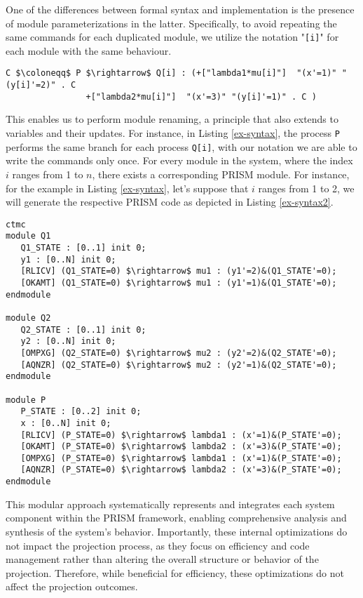 One of the differences between formal syntax and implementation is the presence of module parameterizations in the latter. Specifically, to avoid repeating the same commands for each duplicated module, we utilize the notation "\texttt{[i]}" for each module with the same behaviour.   
\begin{lstlisting}[style=chor-color,breaklines=true, postbreak=\mbox{\textcolor{red}{$\hookrightarrow$}\space},caption={Example of an use of parameterization in the choreographic language},captionpos=b,label={ex-syntax}]
	C $\coloneqq$ P $\rightarrow$ Q[i] : (+["lambda1*mu[i]"]  "(x'=1)" "(y[i]'=2)" . C
			    +["lambda2*mu[i]"]  "(x'=3)" "(y[i]'=1)" . C )
\end{lstlisting}
This enables us to perform module renaming, a principle that also extends to variables and their updates. For instance, in Listing \ref{ex-syntax}, the process \texttt{P} performs the same branch for each process \texttt{Q[i]}, with our notation we are able to write the commands only once. 
For every module in the system, where the index 
$i$ ranges from 1 to $n$, there exists a corresponding PRISM module. For instance, for the example in Listing \ref{ex-syntax}, let's suppose that $i$ ranges  from 1 to 2, we will generate the respective PRISM code as depicted in Listing \ref{ex-syntax2}. 
\begin{lstlisting}[style=prism-color,caption={PRISM code generated for the choreography in Listing \ref{ex-syntax}},captionpos=b,label={ex-syntax2}]
ctmc
module Q1
   Q1_STATE : [0..1] init 0;
   y1 : [0..N] init 0;
   [RLICV] (Q1_STATE=0) $\rightarrow$ mu1 : (y1'=2)&(Q1_STATE'=0);
   [OKAMT] (Q1_STATE=0) $\rightarrow$ mu1 : (y1'=1)&(Q1_STATE'=0);
endmodule

module Q2
   Q2_STATE : [0..1] init 0;
   y2 : [0..N] init 0;
   [OMPXG] (Q2_STATE=0) $\rightarrow$ mu2 : (y2'=2)&(Q2_STATE'=0);
   [AQNZR] (Q2_STATE=0) $\rightarrow$ mu2 : (y2'=1)&(Q2_STATE'=0);
endmodule

module P
   P_STATE : [0..2] init 0;
   x : [0..N] init 0;
   [RLICV] (P_STATE=0) $\rightarrow$ lambda1 : (x'=1)&(P_STATE'=0);
   [OKAMT] (P_STATE=0) $\rightarrow$ lambda2 : (x'=3)&(P_STATE'=0);
   [OMPXG] (P_STATE=0) $\rightarrow$ lambda1 : (x'=1)&(P_STATE'=0);
   [AQNZR] (P_STATE=0) $\rightarrow$ lambda2 : (x'=3)&(P_STATE'=0);
endmodule
\end{lstlisting}
This modular approach systematically represents and integrates each system component within the PRISM framework, enabling comprehensive analysis and synthesis of the system's behavior. Importantly, these internal optimizations do not impact the projection process, as they focus on efficiency and code management rather than altering the overall structure or behavior of the projection. Therefore, while beneficial for efficiency, these optimizations do not affect the projection outcomes.

